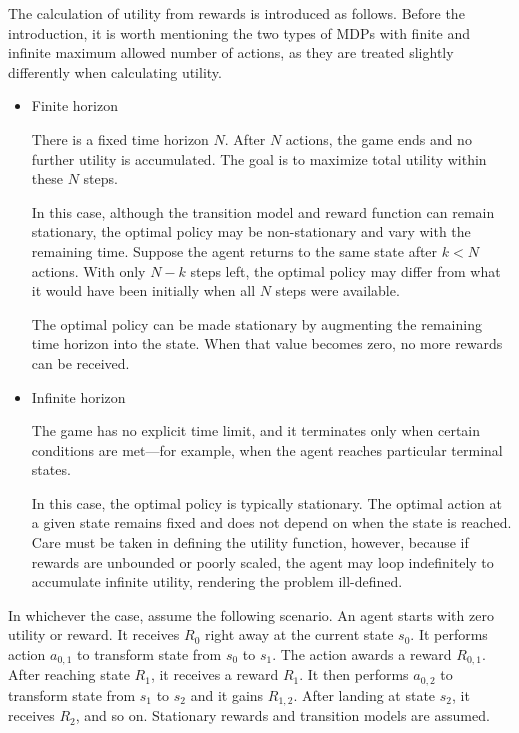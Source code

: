 The calculation of utility from rewards is introduced as follows. Before the introduction, it is worth mentioning the two types of MDPs with finite and infinite maximum allowed number of actions, as they are treated slightly differently when calculating utility.

\begin{itemize}
	\item Finite horizon
	
	There is a fixed time horizon $N$. After $N$ actions, the game ends and no further utility is accumulated. The goal is to maximize total utility within these $N$ steps.
	
	In this case, although the transition model and reward function can remain stationary, the optimal policy may be non-stationary and vary with the remaining time. Suppose the agent returns to the same state after $k<N$ actions. With only $N-k$ steps left, the optimal policy may differ from what it would have been initially when all $N$ steps were available.
	
	The optimal policy can be made stationary by augmenting the remaining time horizon into the state. When that value becomes zero, no more rewards can be received.
	
	\item Infinite horizon
	
	The game has no explicit time limit, and it terminates only when certain conditions are met—for example, when the agent reaches particular terminal states.
	
	In this case, the optimal policy is typically stationary. The optimal action at a given state remains fixed and does not depend on when the state is reached. Care must be taken in defining the utility function, however, because if rewards are unbounded or poorly scaled, the agent may loop indefinitely to accumulate infinite utility, rendering the problem ill-defined.
\end{itemize}

In whichever the case, assume the following scenario. An agent starts with zero utility or reward. It receives $R_0$ right away at the current state $s_0$. It performs action $a_{0,1}$ to transform state from $s_0$ to $s_1$. The action awards a reward $R_{0,1}$. After reaching state $R_1$, it receives a reward $R_1$. It then performs $a_{0,2}$ to transform state from $s_1$ to $s_2$ and it gains $R_{1,2}$. After landing at state $s_2$, it receives $R_2$, and so on. Stationary rewards and transition models are assumed.

